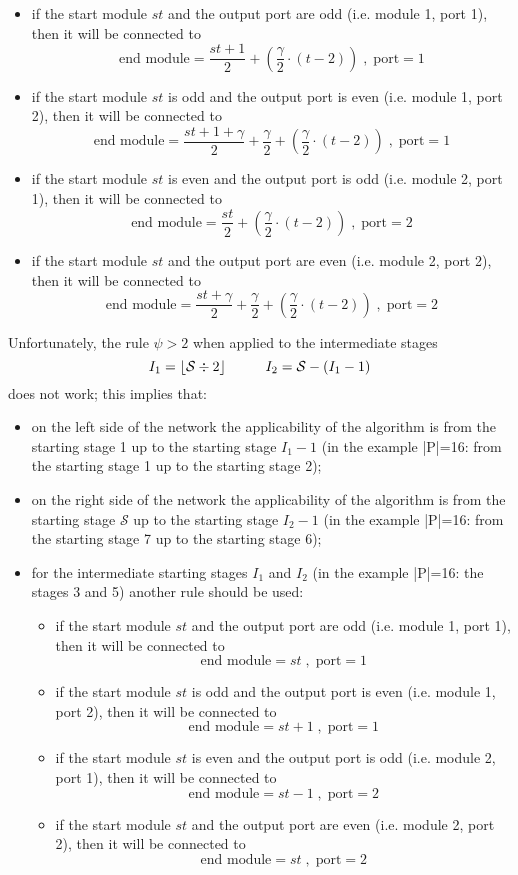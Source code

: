\documentclass{ltxdoc} %
\begin{document}
\begin{itemize}
\begin{itemize}
\item if the start module $st$ and the output port are odd (i.e. module 1, port 1), then it will be connected to  
\[\textrm{end module}=\dfrac{st+1}{2}+\left(\dfrac{\gamma}{2}\cdot (t-2)\right) \; , \; \textrm{port}=1 \]
\item if the start module $st$ is odd and the output port is even (i.e. module 1, port 2), then it will be connected to  
\[\textrm{end module}=\dfrac{st+1+\gamma}{2}+\dfrac{\gamma}{2}+\left(\dfrac{\gamma}{2}\cdot (t-2)\right)\; , \; \textrm{port}=1 \]
\item if the start module $st$ is even and the output port is odd (i.e. module 2, port 1), then it will be connected to  
\[\textrm{end module}=\dfrac{st}{2}+\left(\dfrac{\gamma}{2}\cdot (t-2)\right)\; , \; \textrm{port}=2 \]
\item if the start module $st$ and the output port are even (i.e. module 2, port 2), then it will be connected to  
\[\textrm{end module}=\dfrac{st+\gamma}{2}+\dfrac{\gamma}{2}+\left(\dfrac{\gamma}{2}\cdot (t-2)\right)\; , \; \textrm{port}=2 \]
\end{itemize}
\end{itemize}
Unfortunately, the rule $\psi>2$ when applied to the intermediate stages 
\[I_1=\lfloor\mathcal{S}\div 2\rfloor \hspace*{1cm} I_2=\mathcal{S}-(I_1-1)\]
does not work; this implies that:
\begin{itemize}
\item on the left side of the network the applicability of the algorithm is from the starting stage 1 up to the starting stage $I_1-1$ (in the example |P|=16: from the starting stage 1 up to the starting stage 2);
\item on the right side of the network the applicability of the algorithm is from the starting stage $\mathcal{S}$ up to the starting stage $I_2-1$ (in the example |P|=16: from the starting stage 7 up to the starting stage 6);
\item for the intermediate starting stages $I_1$ and  $I_2$ (in the example |P|=16: the stages 3 and 5) another rule should be used:
\begin{itemize}
\item if the start module $st$ and the output port are odd (i.e. module 1, port 1), then it will be connected to  
\[\textrm{end module}=st\; , \; \textrm{port}=1 \]
\item if the start module $st$ is odd and the output port is even (i.e. module 1, port 2), then it will be connected to  
\[\textrm{end module}=st+1\; , \; \textrm{port}=1 \]
\item if the start module $st$ is even and the output port is odd (i.e. module 2, port 1), then it will be connected to  
\[\textrm{end module}=st-1  \; , \; \textrm{port}=2 \]
\item if the start module $st$ and the output port are even (i.e. module 2, port 2), then it will be connected to  
\[\textrm{end module}=st\; , \; \textrm{port}=2 \]
\end{itemize}
\end{itemize}
\end{document}
